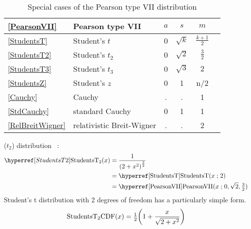 \begin{table*}[tp]
\begin{center}
\caption[Pearson VII distribution -- Special cases]{Special cases of the Pearson type VII distribution}
~\\
{\renewcommand{\arraystretch}{1.25}
\begin{tabular}{llcccl}
\eqref{PearsonVII}&Pearson type VII & $a$ & $s$ & $m$  &  \\
 \hline
\eqref{StudentsT}& Student's $t$		& 0	& $\sqrt{k}$ & $\tfrac{k+1}{2}$  \\
\eqref{StudentsT2}& Student's $t_2$		& 0	& $\sqrt{2}$ & $\tfrac{3}{2}$  \\
\eqref{StudentsT3}& Student's $t_3$		& 0	& $\sqrt{3}$ & $2$  \\
\eqref{StudentsZ}& Student's $z$             	& 0 & 1&  n/2  \\
\eqref{Cauchy} &Cauchy 			& . & . & 1  \\
\eqref{StdCauchy} &standard Cauchy 			& 0 & 1 & 1  \\
\eqref{RelBreitWigner}& relativistic Breit-Wigner  & . & . & 2 \\
\end{tabular} }
\end{center}
\end{table*}




 ($t_2$) distribution~\cite{Jones2002} :
\begin{align}
\label{StudentsT2}
\StudentsTT(x) 
&= \frac{1}{\Left( 2 + x^2 \Right)^{\frac{3}{2} } } \checked
\\ \notag 
& = \opr{StudentsT}(x\given 2) \checked
\\ \notag
&= \opr{PearsonVII}(x\given 0,\sqrt{2},\tfrac{3}{2}) \checked
\end{align}
Student's t distribution with 2 degrees of freedom has a particularly simple form. 
\[
\text{StudentsT}_2\text{CDF}(x) 
= \half \Left(1+\frac{x}{\sqrt{ 2 + x^2 } }\Right) 
\notag
\]



